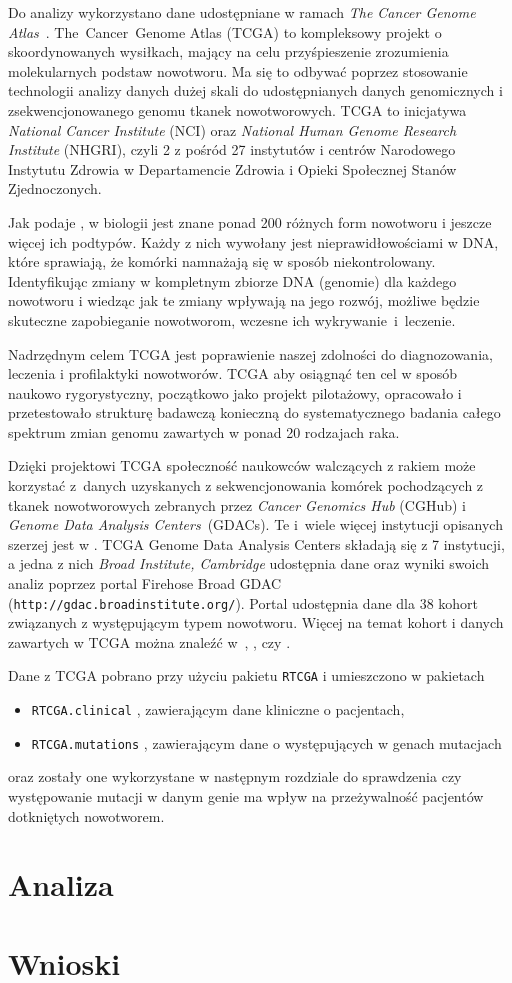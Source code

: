 Do analizy wykorzystano dane udostępniane w ramach \textit{The Cancer Genome Atlas}~\cite{broad}. The~Cancer~Genome Atlas (TCGA) to kompleksowy projekt o skoordynowanych wysiłkach, mający na celu przyśpieszenie zrozumienia molekularnych podstaw nowotworu. Ma się to odbywać poprzez stosowanie technologii analizy danych dużej skali do udostępnianych danych genomicznych i zsekwencjonowanego genomu tkanek nowotworowych. TCGA to inicjatywa \textit{National Cancer Institute} (NCI) oraz \textit{National Human Genome Research Institute} (NHGRI), czyli 2 z pośród 27 instytutów i centrów Narodowego Instytutu Zdrowia w Departamencie Zdrowia i Opieki Społecznej Stanów Zjednoczonych.

Jak podaje \cite{patrycja}, w biologii jest znane ponad 200 różnych form nowotworu i jeszcze więcej ich podtypów. Każdy z nich wywołany jest nieprawidłowościami w DNA, które sprawiają, że komórki namnażają się w sposób niekontrolowany. Identyfikując zmiany w kompletnym zbiorze DNA (genomie) dla każdego nowotworu i wiedząc jak te zmiany wpływają na jego rozwój, możliwe będzie skuteczne zapobieganie nowotworom, wczesne ich wykrywanie~i~leczenie. 

Nadrzędnym celem TCGA jest poprawienie naszej zdolności do diagnozowania, leczenia i profilaktyki nowotworów. TCGA aby osiągnąć ten cel w sposób naukowo rygorystyczny, początkowo jako projekt pilotażowy, opracowało i przetestowało strukturę badawczą konieczną do systematycznego badania całego spektrum zmian genomu zawartych w ponad 20 rodzajach raka.

Dzięki projektowi TCGA społeczność naukowców walczących z rakiem może korzystać z~danych uzyskanych z sekwencjonowania komórek pochodzących z tkanek nowotworowych zebranych przez \textit{Cancer Genomics Hub} (CGHub) i \textit{Genome Data Analysis Centers}~(GDACs). Te i~wiele więcej instytucji opisanych szerzej jest w \cite{patrycja}. TCGA Genome Data Analysis Centers składają się z 7 instytucji, a jedna z nich \textit{Broad Institute, Cambridge} udostępnia dane oraz wyniki swoich analiz poprzez portal Firehose Broad GDAC (\texttt{http://gdac.broadinstitute.org/}). Portal udostępnia dane dla 38 kohort związanych z występującym typem nowotworu. Więcej na temat kohort i danych zawartych w TCGA można znaleźć w~\cite{chin1}, \cite{chin2}, \cite{future} czy \cite{patrycja}. 

Dane z TCGA pobrano przy użyciu pakietu \texttt{RTCGA} \cite{kosa1} i umieszczono w pakietach
\begin{itemize}
\item \texttt{RTCGA.clinical} \cite{kosa2}, zawierającym dane kliniczne o pacjentach,
\item \texttt{RTCGA.mutations} \cite{kosa3}, zawierającym dane o występujących w genach mutacjach
\end{itemize} 
oraz zostały one wykorzystane w następnym rozdziale do sprawdzenia czy występowanie mutacji w danym genie ma wpływ na przeżywalność pacjentów dotkniętych nowotworem.



\section{Analiza}\label{chap:analiza}
\section{Wnioski}\label{chap:wnioski}